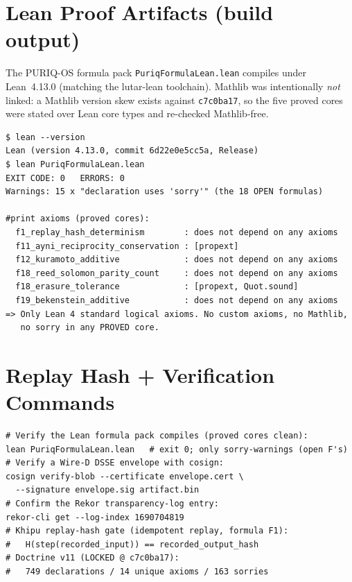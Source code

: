 \documentclass[11pt]{article}
\theoremstyle{plain}
\theoremstyle{definition}
\theoremstyle{remark}
\begin{document}
\appendix
\section{Lean Proof Artifacts (build output)}
\label{app:lean}
The PURIQ-OS formula pack \texttt{PuriqFormulaLean.lean} compiles under Lean~4.13.0
(matching the lutar-lean toolchain). Mathlib was intentionally \emph{not} linked: a
Mathlib version skew exists against \texttt{c7c0ba17}, so the five proved cores were
stated over Lean core types and re-checked Mathlib-free.
\begin{lstlisting}
$ lean --version
Lean (version 4.13.0, commit 6d22e0e5cc5a, Release)
$ lean PuriqFormulaLean.lean
EXIT CODE: 0   ERRORS: 0
Warnings: 15 x "declaration uses 'sorry'" (the 18 OPEN formulas)

#print axioms (proved cores):
  f1_replay_hash_determinism        : does not depend on any axioms
  f11_ayni_reciprocity_conservation : [propext]
  f12_kuramoto_additive             : does not depend on any axioms
  f18_reed_solomon_parity_count     : does not depend on any axioms
  f18_erasure_tolerance             : [propext, Quot.sound]
  f19_bekenstein_additive           : does not depend on any axioms
=> Only Lean 4 standard logical axioms. No custom axioms, no Mathlib,
   no sorry in any PROVED core.
\end{lstlisting}

\section{Replay Hash + Verification Commands}
\label{app:verify}
\begin{lstlisting}
# Verify the Lean formula pack compiles (proved cores clean):
lean PuriqFormulaLean.lean   # exit 0; only sorry-warnings (open F's)
# Verify a Wire-D DSSE envelope with cosign:
cosign verify-blob --certificate envelope.cert \
  --signature envelope.sig artifact.bin
# Confirm the Rekor transparency-log entry:
rekor-cli get --log-index 1690704819
# Khipu replay-hash gate (idempotent replay, formula F1):
#   H(step(recorded_input)) == recorded_output_hash
# Doctrine v11 (LOCKED @ c7c0ba17):
#   749 declarations / 14 unique axioms / 163 sorries
\end{lstlisting}
\end{document}
